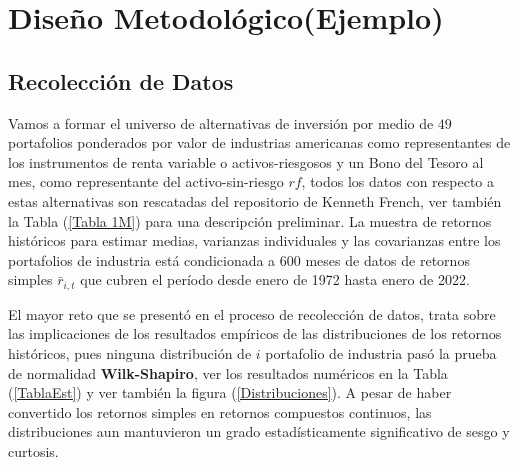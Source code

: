 \section{Diseño Metodológico(Ejemplo)}
\subsection{Recolección de Datos}
Vamos a formar el universo de alternativas de inversión por medio de $49$ portafolios ponderados por valor de industrias americanas como representantes de los instrumentos de renta variable o activos-riesgosos y un Bono del Tesoro al mes, como representante del activo-sin-riesgo $rf$, todos los datos con respecto a estas alternativas son rescatadas del repositorio de Kenneth French, ver también la Tabla (\ref{Tabla 1M}) para una descripción preliminar. La muestra de retornos históricos para estimar medias, varianzas individuales y las covarianzas entre los portafolios de industria está condicionada a 600 meses de datos de retornos simples $\bar{r}_{i,t}$ que cubren el período desde enero de 1972 hasta enero de 2022.

El mayor reto que se presentó en el proceso de recolección de datos, trata sobre las implicaciones de los resultados empíricos de las distribuciones de los retornos históricos, pues ninguna distribución de $i$ portafolio de industria pasó la prueba de normalidad \textbf{Wilk-Shapiro}, ver los resultados numéricos en la Tabla (\ref{TablaEst}) y ver también la figura (\ref{Distribuciones}). A pesar de haber convertido los retornos simples en retornos compuestos continuos, las distribuciones aun mantuvieron un grado estadísticamente significativo de sesgo y curtosis.

\newpage

